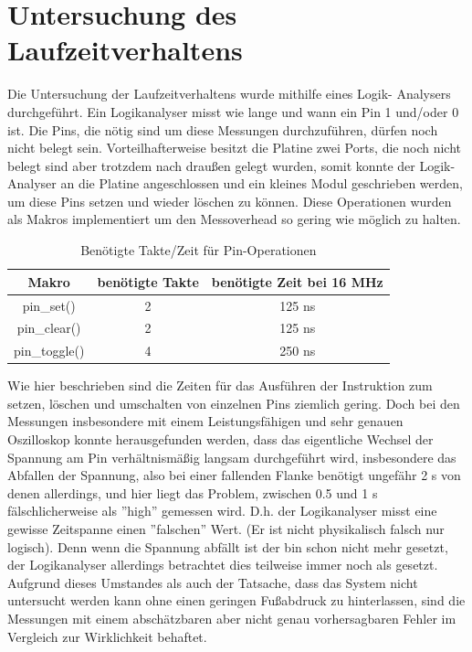 \chapter{Untersuchung des Laufzeitverhaltens}
Die Untersuchung der Laufzeitverhaltens wurde mithilfe eines Logik-
Analysers durchgeführt. Ein Logikanalyser misst wie lange und wann
ein Pin 1 und/oder 0 ist. Die Pins, die nötig sind um diese Messungen
durchzuführen, dürfen noch nicht belegt sein. Vorteilhafterweise
besitzt die Platine zwei Ports, die noch nicht belegt sind aber
trotzdem nach draußen gelegt wurden, somit konnte der Logik-
Analyser an die Platine angeschlossen und ein kleines Modul
geschrieben werden, um diese Pins setzen und wieder löschen zu
können. Diese Operationen wurden als Makros implementiert um den
Messoverhead so gering wie möglich zu halten.
\begin{table}[htb]
\begin{center}
	\begin{tabular}{|c||c|c|}
		\hline
		\textbf{Makro} & \textbf{benötigte Takte} & \textbf{benötigte Zeit bei 16 MHz} \\ \hline \hline
		pin\_set() & 2 & 125 ns \\ \hline
		pin\_clear() & 2 & 125 ns \\ \hline
		pin\_toggle() & 4 & 250 ns \\ \hline
	\end{tabular}
	\caption{\label{pin_takte} Benötigte Takte/Zeit für Pin-Operationen}
\end{center}
\end{table}
Wie hier beschrieben sind die Zeiten für das Ausführen der Instruktion
zum setzen, löschen und umschalten von einzelnen Pins ziemlich gering.
Doch bei den Messungen insbesondere mit einem Leistungsfähigen und
sehr genauen Oszilloskop konnte herausgefunden werden, dass das eigentliche
Wechsel der Spannung am Pin verhältnismäßig langsam durchgeführt wird,
insbesondere das Abfallen der Spannung, also bei einer fallenden Flanke
benötigt ungefähr 2 \textmu{}s von denen allerdings, und hier liegt das Problem,
zwischen 0.5 und 1 \textmu{}s fälschlicherweise als ''high'' gemessen wird.
D.h. der Logikanalyser misst eine gewisse Zeitspanne einen ''falschen'' Wert.
(Er ist nicht physikalisch falsch nur logisch). Denn wenn die Spannung abfällt
ist der bin schon nicht mehr gesetzt, der Logikanalyser allerdings betrachtet
dies teilweise immer noch als gesetzt.
Aufgrund dieses Umstandes als auch der Tatsache, dass das System nicht untersucht
werden kann ohne einen geringen Fußabdruck zu hinterlassen, sind die Messungen mit
einem abschätzbaren aber nicht genau vorhersagbaren Fehler im Vergleich zur
Wirklichkeit behaftet.

